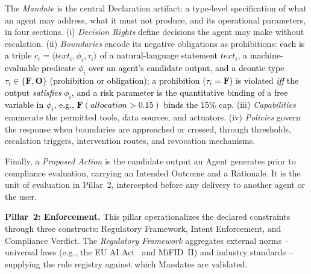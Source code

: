 \documentclass[runningheads]{llncs}
\begin{document}
The \textit{Mandate} is the central Declaration artifact: a
type-level specification of what an agent may address, what it must not produce, and its operational parameters, in four sections. (i) \textit{Decision Rights} define decisions the agent may make without escalation. (ii) \textit{Boundaries} encode its negative obligations as prohibitions: \textcolor{black}{each is a triple $c_i = \langle \mathit{text}_i, \phi_i, \tau_i \rangle$ of a natural-language statement $\mathit{text}_i$, a machine-evaluable predicate $\phi_i$ over an agent's candidate output, and a deontic type $\tau_i \in \{\mathbf{F}, \mathbf{O}\}$  (prohibition or obligation); a prohibition ($\tau_i = \mathbf{F}$) is violated \emph{iff} the output \emph{satisfies} $\phi_i$, and a risk parameter is the quantitative binding of a free variable in $\phi_i$, e.g., $\mathbf{F}(\textit{allocation} > 0.15)$ binds the 15\% cap.} (iii) \textit{Capabilities} enumerate the permitted tools, data sources, and actuators. (iv) \textit{Policies} govern the response when boundaries are approached or crossed, through thresholds, escalation triggers, intervention routes, and revocation mechanisms.

Finally, a \textit{Proposed Action} is the candidate output an Agent generates prior to compliance evaluation, carrying an Intended Outcome and a Rationale. It is the unit of evaluation in Pillar~2, intercepted before any delivery to another agent or the user.

\vspace{6pt}
\textbf{Pillar~2: Enforcement.}
This pillar operationalizes the declared constraints through three constructs: Regulatory Framework, Intent Enforcement, and Compliance Verdict. The \textit{Regulatory Framework} aggregates external norms -- universal laws (e.g., the EU AI Act~\cite{euaiact2024} and MiFID~II) and industry standards -- supplying the rule registry against which Mandates are validated. 
\end{document}
